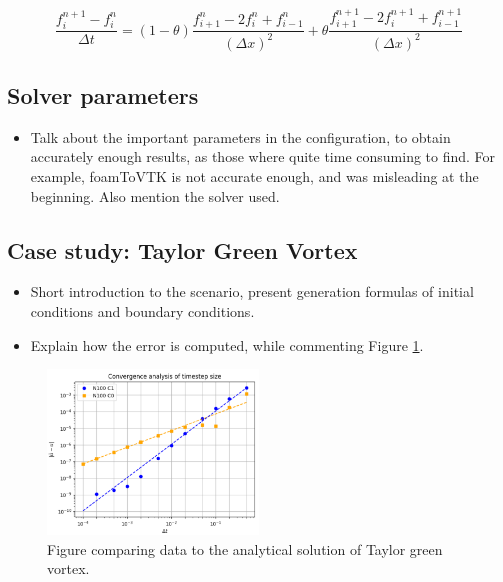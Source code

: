 \documentclass[
  english,        %
  font=times,     %
  onecolumn,      %
]{tumarticle}
\begin{document}
\begin{equation}
    \frac{f_i^{n+1} - f_i^{n}}{\Delta t} = (1 - \theta) \frac{f_{i + 1}^{n} - 2f_{i}^{n} + f_{i - 1}^{n}}{\left( \Delta x \right)^2} + \theta \frac{f_{i + 1}^{n + 1} - 2f_{i}^{n + 1} + f_{i - 1}^{n + 1}}{\left( \Delta x \right)^2}
\end{equation}

\cite{crank1947practical}


\subsection{Solver parameters}
\begin{itemize}
    \item Talk about the important parameters in the configuration, to obtain accurately enough results, as those where quite time consuming to find. For example, foamToVTK is not accurate enough, and was misleading at the beginning. Also mention the solver used.
\end{itemize}

\subsection{Case study: Taylor Green Vortex}
\begin{itemize}
    \item Short introduction to the scenario, present generation formulas of initial conditions and boundary conditions.
    \item Explain how the error is computed, while commenting Figure \ref{fig:error_x_y}.
\end{itemize}

\begin{figure}[!ht]
    \centering
    \includegraphics[width=0.5\textwidth]{resources/convergence_study_N100.png}
    \caption{Figure comparing data to the analytical solution of Taylor green vortex.}
    \label{fig:error_x_y}
\end{figure}
\end{document}
